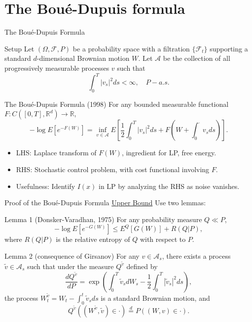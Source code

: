 \documentclass{if-beamer}
\begin{document}
\section{The Boué-Dupuis formula}

\begin{frame}{The Boué-Dupuis Formula}
    \begin{block}{Setup}
        Let $(\Omega, \mathcal{F}, P)$ be a probability space with a filtration $\{\mathcal{F}_t\}$ supporting a standard $d$-dimensional Brownian motion $W$. Let $\mathcal{A}$ be the collection of all progressively measurable processes $v$ such that
        \[
            \int_0^T |v_s|^2 ds < \infty, \quad P-a.s.
        \]
    \end{block}

    \begin{block}{The Boué-Dupuis Formula (1998)}
        For any bounded measurable functional $F: C([0, T], \mathbb{R}^d) \to \mathbb{R}$,
        \[
            -\log E\left[e^{-F(W)}\right] = \inf_{v \in \mathcal{A}} E\left[ \frac{1}{2} \int_0^T |v_s|^2 ds + F\left( W + \int_0^{\cdot} v_s ds \right) \right].
        \]
    \end{block}

    \begin{itemize}[<+->]
        \item LHS: Laplace transform of $F(W)$, ingredient for LP, free energy.
        \item RHS: Stochastic control problem, with cost functional involving $F$.
        \item Usefulness: Identify $I(x)$ in LP by analyzing the RHS as noise vanishes.
    \end{itemize}
\end{frame}

\begin{frame}{Proof of the Boué-Dupuis Formula}
    \underline{Upper Bound} Use two lemmas:
    \begin{block}{Lemma 1 (Donsker-Varadhan, 1975)}
        For any probability measure $Q \ll P$,
        \[
            -\log E\left[e^{-G(W)}\right] \leq E^Q[G(W)] + R(Q|P),
        \]
        where $R(Q|P)$ is the relative entropy of $Q$ with respect to $P$.
    \end{block}
    \begin{block}{Lemma 2 (consequence of Girsanov)}
        For any $v \in \mathcal{A}_s$, there exists a process $\tilde v \in \mathcal{A}_s$ such that under the measure $Q^{\tilde v}$ defined by
        \[
            \frac{d Q^{\tilde v}}{d P} = \exp\left( \int_0^T \tilde v_s dW_s - \frac{1}{2} \int_0^T |\tilde v_s|^2 ds \right),
        \]
        the process $W^{\tilde v}_t = W_t - \int_0^t \tilde v_s ds$ is a standard Brownian motion, and
        \[
            Q^{\tilde v}\left((W^{\tilde v}, \tilde v) \in \cdot \right) \stackrel{d}{=} P\left( (W, v) \in \cdot \right).
        \]
    \end{block}
    
\end{frame}
\end{document}
